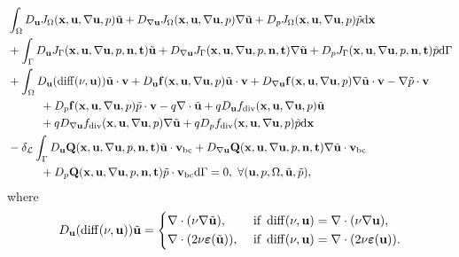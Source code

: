 \documentclass[oneside,11pt]{book}
\numberwithin{equation}{section}
\begin{document}
\begin{align*}
    &\int_\Omega D_{\bf u}J_\Omega({\bf x},{\bf u},\nabla{\bf u},p)\tilde{\bf u} + D_{\nabla{\bf u}}J_\Omega({\bf x},{\bf u},\nabla{\bf u},p)\nabla\tilde{\bf u} + D_pJ_\Omega({\bf x},{\bf u},\nabla{\bf u},p)\tilde{p}{\rm d}{\bf x}\\
    &+ \int_\Gamma D_{\bf u}J_\Gamma({\bf x},{\bf u},\nabla{\bf u},p,{\bf n},{\bf t})\tilde{\bf u} + D_{\nabla{\bf u}}J_\Gamma({\bf x},{\bf u},\nabla{\bf u},p,{\bf n},{\bf t})\nabla\tilde{\bf u} + D_pJ_\Gamma({\bf x},{\bf u},\nabla{\bf u},p,{\bf n},{\bf t})\tilde{p}{\rm d}\Gamma\\
    &+\int_\Omega D_{\bf u}(\operatorname{diff}(\nu,{\bf u}))\tilde{\bf u}\cdot{\bf v} + D_{\bf u}{\bf f}({\bf x},{\bf u},\nabla{\bf u},p)\tilde{\bf u}\cdot{\bf v} + D_{\nabla{\bf u}}{\bf f}({\bf x},{\bf u},\nabla{\bf u},p)\nabla\tilde{\bf u}\cdot{\bf v} - \nabla\tilde{p}\cdot{\bf v}\\
    &\hspace{1cm}+ D_p{\bf f}({\bf x},{\bf u},\nabla{\bf u},p)\tilde{p}\cdot{\bf v} - q\nabla\cdot\tilde{\bf u} + qD_{\bf u}f_{\rm div}({\bf x},{\bf u},\nabla{\bf u},p)\tilde{\bf u}\\
    &\hspace{1cm}+ qD_{\nabla{\bf u}}f_{\rm div}({\bf x},{\bf u},\nabla{\bf u},p)\nabla\tilde{\bf u} + qD_pf_{\rm div}({\bf x},{\bf u},\nabla{\bf u},p)\tilde{p}{\rm d}{\bf x}\\
    &-\delta_{\mathcal{L}}\int_\Gamma D_{\bf u}{\bf Q}({\bf x},{\bf u},\nabla{\bf u},p,{\bf n},{\bf t})\tilde{\bf u}\cdot{\bf v}_{\rm bc} + D_{\nabla{\bf u}}{\bf Q}({\bf x},{\bf u},\nabla{\bf u},p,{\bf n},{\bf t})\nabla\tilde{\bf u}\cdot{\bf v}_{\rm bc}\\
    &\hspace{1cm}+ D_p{\bf Q}({\bf x},{\bf u},\nabla{\bf u},p,{\bf n},{\bf t})\tilde{p}\cdot{\bf v}_{\rm bc}{\rm d}\Gamma = 0,\ \forall({\bf u},p,\Omega,\tilde{\bf u},\tilde{p}),
\end{align*}
where
\begin{equation*}
    D_{\bf u}(\operatorname{diff}(\nu,{\bf u}))\tilde{\bf u} = \left\{\begin{split}
        &\nabla\cdot(\nu\nabla\tilde{\bf u}),&&\mbox{ if } \operatorname{diff}(\nu,{\bf u}) = \nabla\cdot(\nu\nabla{\bf u}),\\
        &\nabla\cdot(2\nu\boldsymbol{\varepsilon}(\tilde{\bf u})),&&\mbox{ if }\operatorname{diff}(\nu,{\bf u}) = \nabla\cdot(2\nu\boldsymbol{\varepsilon}({\bf u})).
    \end{split}\right.
\end{equation*}
\end{document}

